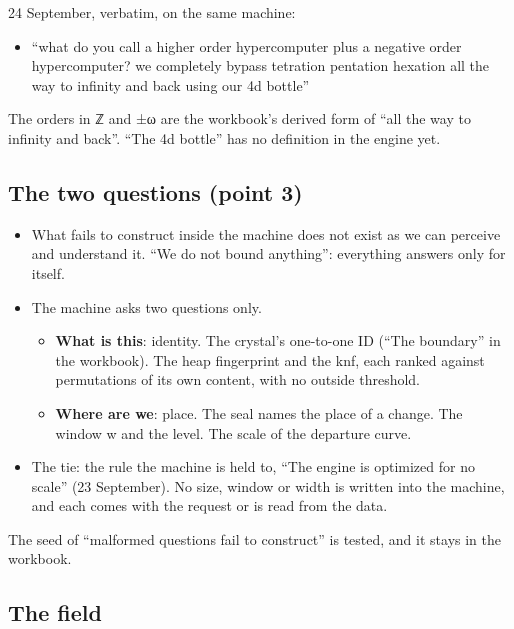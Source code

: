 24 September, verbatim, on the same machine:

\begin{itemize}
\item “what do you call a higher order hypercomputer plus a negative order hypercomputer? we completely bypass tetration pentation hexation all the way to infinity and back using our 4d bottle”
\end{itemize}

The orders in ℤ and ±ω are the workbook's derived form of “all the way to infinity and back”. “The 4d bottle” has no definition in the engine yet.

\subsection{\texorpdfstring{The two questions (point 3)}{The two questions (point 3)}}

\begin{itemize}
\item What fails to construct inside the machine does not exist as we can perceive and understand it. “We do not bound anything”: everything answers only for itself.
\item The machine asks two questions only.

\begin{itemize}
\item \textbf{What is this}: identity. The crystal's one-to-one ID (“The boundary” in the workbook). The heap fingerprint and the knf, each ranked against permutations of its own content, with no outside threshold.
\item \textbf{Where are we}: place. The seal names the place of a change. The window w and the level. The scale of the departure curve.
\end{itemize}
\item The tie: the rule the machine is held to, “The engine is optimized for no scale” (23 September). No size, window or width is written into the machine, and each comes with the request or is read from the data.
\end{itemize}

The seed of “malformed questions fail to construct” is tested, and it stays in the workbook.

\subsection{\texorpdfstring{The field}{The field}}

